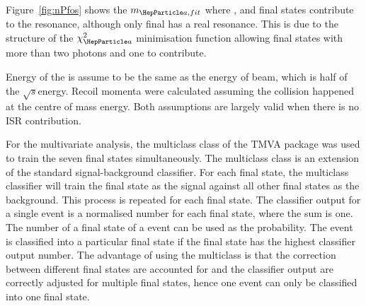 \documentclass[a4paper,11pt]{article}
\newcommand{\decayRho}{\PGrP{\PGpm\PGpz}\PGnGt}
\newcommand{\decayAiPhoton}{\PaDoP{\PGpm\PGpz\PGpz}\PGnGt}
\newcommand{\decayThreePionPhoton}{\PGpm\PGpm\PGpp\PGnGt}
\newcommand{\rootS}{\ensuremath{\sqrt{s}}}
\begin{document}
Figure~\ref{fig:nPfos} shows the $m_{\Pa,fit}$ where \decayRho, \decayAiPhoton  and \decayThreePionPhoton final states contribute to the \Pa resonance, although only \decayAiPhoton final has a real \Pa resonance. This is due to the structure of the  $\chi_{\Pa}^{2}$ minimisation function allowing final states with more than two photons and one \PGppm to contribute.






Energy of the \PGt is assume to be the same as the energy of \Pepm beam, which is half of the \rootS energy. Recoil momenta were calculated assuming the \Pem\Pep collision happened at the centre of mass energy. Both assumptions are largely valid when there is no ISR contribution. %

For the multivariate analysis, the multiclass class of the TMVA package \cite{Therhaag:2009dp} was used to train the seven final states simultaneously. The multiclass class is an extension of the standard signal-background classifier. For each final state, the multiclass classifier will train the final state as the signal against all other final states as the background. This process is repeated for each final state. The classifier output for a single event is a normalised number for each final state, where the sum is one. The number of a final state of a event can be used as the probability. The event is classified into a particular final state if the final state has the highest classifier output number. The advantage of using the multiclass is that the correction between different final states are accounted for and the classifier output are correctly adjusted for multiple final states, hence one event can only be classified into one final state.
\end{document}
